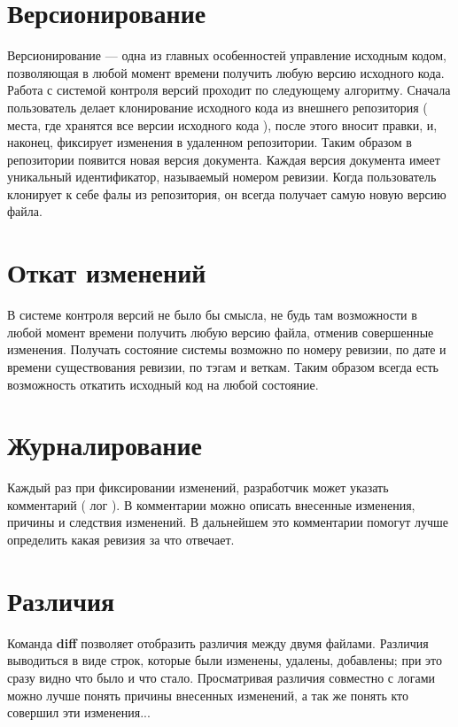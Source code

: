 \section{ Версионирование } \label{sect3_3}

Версионирование --- одна из главных особенностей управление исходным кодом, позволяющая в любой момент времени получить любую версию исходного кода. Работа с системой контроля версий  проходит по следующему алгоритму. Сначала пользователь делает клонирование исходного кода из внешнего репозитория ( места, где хранятся все версии исходного кода ), после этого вносит правки, и, наконец, фиксирует изменения в удаленном репозитории. Таким образом в репозитории появится новая версия документа. Каждая версия документа имеет уникальный идентификатор, называемый номером ревизии. Когда пользователь клонирует к себе фалы из репозитория, он всегда получает самую новую версию файла.


\section{ Откат изменений } \label{sect3_4}

В системе контроля версий не было бы смысла, не будь там возможности в любой момент времени получить любую версию файла, отменив совершенные изменения. Получать состояние системы возможно по номеру ревизии, по дате и времени существования ревизии, по тэгам и веткам. Таким образом всегда есть возможность откатить исходный код на любой состояние.

\section{ Журналирование } \label{sect3_5}

Каждый раз при фиксировании изменений, разработчик может указать комментарий ( лог ). В комментарии можно описать внесенные изменения, причины и следствия изменений. В дальнейшем это комментарии помогут лучше определить какая ревизия за что отвечает.

\section{ Различия } \label{sect3_6}

Команда \textbf{diff} позволяет отобразить различия между двумя файлами. Различия выводиться в виде строк, которые были изменены, удалены, добавлены; при это сразу видно что было и что стало. Просматривая различия совместно с логами можно лучше понять причины внесенных изменений, а так же понять кто совершил эти изменения...


